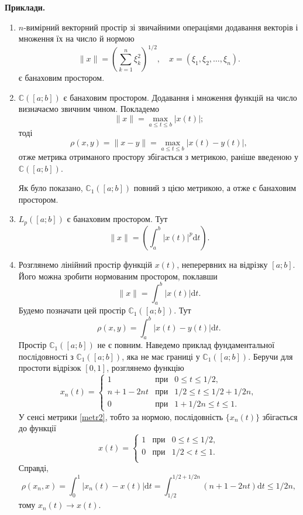 \documentclass[14pt,twoside]{extreport}
\theoremstyle{mystyle}
\numberwithin{equation}{chapter}
\newcommand{\cab}{\mathbb{C}([a; b])}
\begin{document}
\textbf{Приклади.}
\begin{enumerate}
	\item $n$-вимірний векторний простір зі звичайними операціями додавання векторів і множення їх на число й нормою
	\[
	\|x\|=\left(\sum_{k=1}^{n}\xi_{k}^{2}\right)^{1/2},\quad x=(\xi_1, \xi_2, \ldots, \xi_n).
	\]
	є банаховим простором.
	\item $\cab$ є банаховим простором. Додавання і множення функцій на число визначаємо звичним чином. Покладемо
	\[
	\|x\| = \max\limits_{a\leqslant t \leqslant b} |x(t)|;
	\]
	тоді
	\[
	\rho(x, y) = \|x-y\| = \max\limits_{a\leqslant t \leqslant b} |x(t) - y(t)|,
	\]
	отже метрика отриманого простору збігається з метрикою, раніше введеною у $\cab$.
	
	Як було показано, $\mathbb{C}_1([a; b])$ повний з цією метрикою, а отже є банаховим простором.
	\item $L_p([a; b])$ є банаховим простором. Тут
	\[
	\|x\|=\left(\int_{a}^{b}|x(t)|^p\mathrm{d}t\right).
	\]
	\item Розглянемо лінійний простір функцій $x(t)$, неперервних на відрізку $[a; b]$. Його можна зробити нормованим простором, поклавши
	\[
	\|x\| = \int_{a}^{b} |x(t)|\mathrm{d}t.
	\]
	Будемо позначати цей простір $\mathbb{C}_1([a; b])$. Тут
	\begin{equation}\label{metr2}
	\rho(x, y) = \int_{a}^{b} |x(t) - y(t)| \mathrm{d}t.
	\end{equation}
	Простір $\mathbb{C}_1([a; b])$ не є повним. Наведемо приклад фундаментальної послідовності з $\mathbb{C}_1([a; b])$, яка не має границі у $\mathbb{C}_1([a; b])$. Беручи для простоти відрізок $[0, 1]$, розглянемо функцію
	\[
	x_n(t)=\left\{
	\begin{array}{cll}
	1 & \textrm{при} & 0 \leqslant t \leqslant 1/2,\\
	n+1-2nt & \textrm{при} & 1/2 \leqslant t \leqslant 1/2+1/2n,\\
	0 & \textrm{при} & 1+1/2n \leqslant t \leqslant 1.
	\end{array}
	\right.
	\]
	У сенсі метрики \eqref{metr2}, тобто за нормою, послідовність $\{x_n(t)\}$ збігається до функції
	\[
	x(t)=\left\{
	\begin{array}{lll}
	1 & \textrm{при} & 0 \leqslant t \leqslant 1/2,\\
	0 & \textrm{при} & 1/2 < t \leqslant 1.\\
	\end{array}
	\right.
	\]
	Справді,
	\[
	\rho(x_n, x) = \int_{0}^{1} |x_n(t) - x(t)| \mathrm{d}t = \int_{1/2}^{1/2+1/2n} (n + 1 - 2nt) \mathrm{d}t \leqslant 1/2n,
	\]
	тому $x_n(t) \to x(t)$.
	

\end{enumerate}
\end{document}
